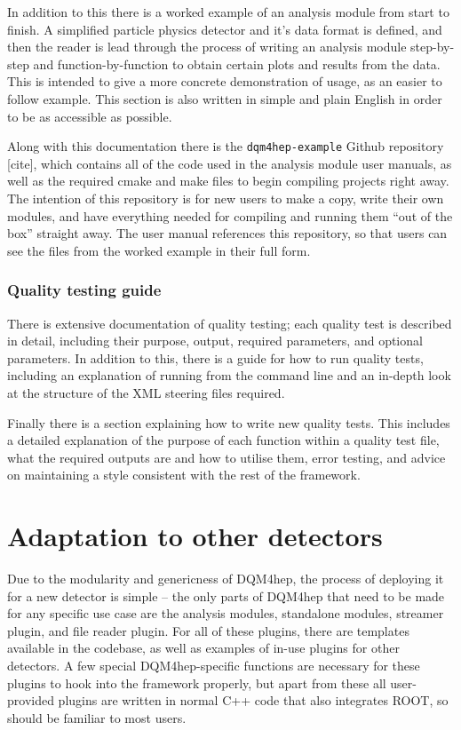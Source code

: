 In addition to this there is a worked example of an analysis module from start to finish. A simplified particle physics detector and it's data format is defined, and then the reader is lead through the process of writing an analysis module step-by-step and function-by-function to obtain certain plots and results from the data. This is intended to give a more concrete demonstration of usage, as an easier to follow example. This section is also written in simple and plain English in order to be as accessible as possible.

Along with this documentation there is the \texttt{dqm4hep-example} Github repository [cite], which contains all of the code used in the analysis module user manuals, as well as the required cmake and make files to begin compiling projects right away. The intention of this repository is for new users to make a copy, write their own modules, and have everything needed for compiling and running them ``out of the box'' straight away. The user manual references this repository, so that users can see the files from the worked example in their full form.

\subsubsection*{Quality testing guide}
There is extensive documentation of quality testing; each quality test is described in detail, including their purpose, output, required parameters, and optional parameters. In addition to this, there is a guide for how to run quality tests, including an explanation of running from the command line and an in-depth look at the structure of the \acrshort{XML} steering files required.

Finally there is a section explaining how to write new quality tests. This includes a detailed explanation of the purpose of each function within a quality test file, what the required outputs are and how to utilise them, error testing, and advice on maintaining a style consistent with the rest of the framework.

\section{Adaptation to other detectors}
Due to the modularity and genericness of \acrshort{DQM4hep}, the process of deploying it for a new detector is simple -- the only parts of \acrshort{DQM4hep} that need to be made for any specific use case are the analysis modules, standalone modules, streamer plugin, and file reader plugin. For all of these plugins, there are templates available in the codebase, as well as examples of in-use plugins for other detectors. A few special \acrshort{DQM4hep}-specific functions are necessary for these plugins to hook into the framework properly, but apart from these all user-provided plugins are written in normal C++ code that also integrates ROOT, so should be familiar to most users.

